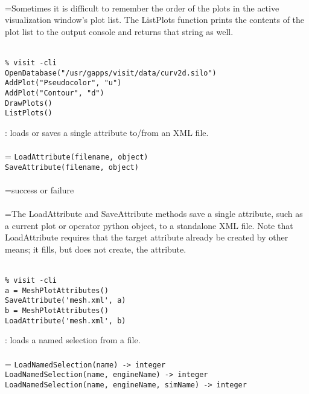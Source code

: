 \documentclass[10pt,a4paper]{report}
\begin{document}
 \\ 
\hangindent=\parindent Sometimes it is difficult to remember the order of the plots in the active visualization window's plot list. The ListPlots function prints the contents of the plot list to the output console and returns that string as well. \\[-3mm] 

\\[-6mm]
\begin{verbatim}% visit -cli
OpenDatabase("/usr/gapps/visit/data/curv2d.silo")
AddPlot("Pseudocolor", "u")
AddPlot("Contour", "d")
DrawPlots()
ListPlots()
\end{verbatim}
\newpage


{}
: loads or saves a single attribute to/from an XML file.\\[-3mm]

 \\ 
\hangindent=\parindent 
\verb!LoadAttribute(filename, object)!\\ 
\verb!SaveAttribute(filename, object)!\\ [-3mm]

 \\ 
\hangindent=\parindent success or failure \\[-3mm] 

 \\ 
\hangindent=\parindent The LoadAttribute and SaveAttribute methods save a single attribute, such as a current plot or operator python object, to a standalone XML file.  Note that LoadAttribute requires that the target attribute already be created by other means; it fills, but does not create, the attribute. \\[-3mm] 

\\[-6mm]
\begin{verbatim}% visit -cli
a = MeshPlotAttributes()
SaveAttribute('mesh.xml', a)
b = MeshPlotAttributes()
LoadAttribute('mesh.xml', b)
\end{verbatim}
\newpage


{}
: loads a named selection from a file.\\[-3mm]

 \\ 
\hangindent=\parindent 
\verb!LoadNamedSelection(name) -> integer!\\ 
\verb!LoadNamedSelection(name, engineName) -> integer!\\ 
\verb!LoadNamedSelection(name, engineName, simName) -> integer!\\ [-3mm]
\end{document}
